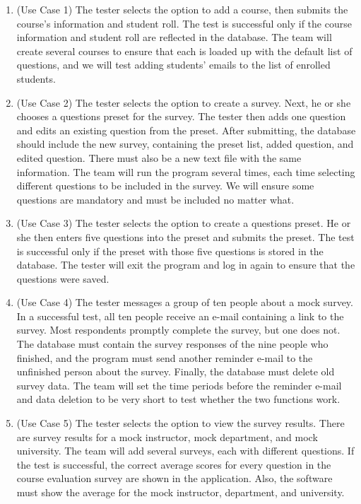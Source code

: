 \documentclass{article}
\begin{document}
\begin{enumerate}
  \item (Use Case 1) The tester selects the option to add a course, then submits the course's information and student roll. The test is successful only if the course information and student roll are reflected in the database. The team will create several courses to ensure that each is loaded up with the default list of questions, and we will test adding students' emails to the list of enrolled students.
  \item (Use Case 2) The tester selects the option to create a survey. Next, he or she chooses a questions preset for the survey. The tester then adds one question and edits an existing question from the preset. After submitting, the database should include the new survey, containing the preset list, added question, and edited question. There must also be a new text file with the same information. The team will run the program several times, each time selecting different questions to be included in the survey. We will ensure some questions are mandatory and must be included no matter what.
  \item (Use Case 3) The tester selects the option to create a questions preset. He or she then enters five questions into the preset and submits the preset. The test is successful only if the preset with those five questions is stored in the database. The tester will exit the program and log in again to ensure that the questions were saved.
  \item (Use Case 4) The tester messages a group of ten people about a mock survey. In a successful test, all ten people receive an e-mail containing a link to the survey. Most respondents promptly complete the survey, but one does not. The database must contain the survey responses of the nine people who finished, and the program must send another reminder e-mail to the unfinished person about the survey. Finally, the database must delete old survey data. The team will set the time periods before the reminder e-mail and data deletion to be very short to test whether the two functions work.
  \item (Use Case 5) The tester selects the option to view the survey results. There are survey results for a mock instructor, mock department, and mock university. The team will add several surveys, each with different questions. If the test is successful, the correct average scores for every question in the course evaluation survey are shown in the application. Also, the software must show the average for the mock instructor, department, and university.
\end{enumerate}
\end{document}
